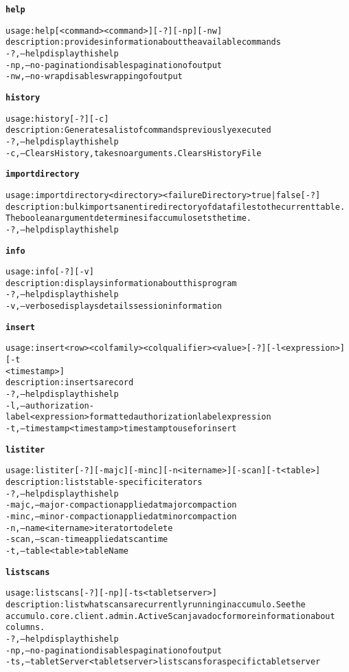 \begin{alltt}
\textbf{help}

    usage: help [ <command>{ <command>} ] [-?] [-np] [-nw]
    description: provides information about the available commands
      -?,--help  display this help
      -np,--no-pagination  disables pagination of output
      -nw,--no-wrap  disables wrapping of output

\textbf{history}

    usage: history [-?] [-c]
    description: Generates a list of commands previously executed
      -?,--help  display this help
      -c,--Clears History, takes no arguments.  Clears History File

\textbf{importdirectory}

    usage: importdirectory <directory> <failureDirectory> true|false [-?]
    description: bulk imports an entire directory of data files to the current table. 
              The boolean argument determines if accumulo sets the time.
      -?,--help  display this help

\textbf{info}

    usage: info [-?] [-v]
    description: displays information about this program
      -?,--help  display this help
      -v,--verbose  displays details session information

\textbf{insert}

    usage: insert <row> <colfamily> <colqualifier> <value> [-?] [-l <expression>] [-t
              <timestamp>]
    description: inserts a record
      -?,--help  display this help
      -l,--authorization-label <expression>  formatted authorization label expression
      -t,--timestamp <timestamp>  timestamp to use for insert

\textbf{listiter}

    usage: listiter [-?] [-majc] [-minc] [-n <itername>] [-scan] [-t <table>]
    description: lists table-specific iterators
      -?,--help  display this help
      -majc,--major-compaction  applied at major compaction
      -minc,--minor-compaction  applied at minor compaction
      -n,--name <itername>  iterator to delete
      -scan,--scan-time  applied at scan time
      -t,--table <table>  tableName

\textbf{listscans}

    usage: listscans [-?] [-np] [-ts <tablet server>]
    description: list what scans are currently running in accumulo. See the
              accumulo.core.client.admin.ActiveScan javadoc for more information about
              columns.
      -?,--help  display this help
      -np,--no-pagination  disables pagination of output
      -ts,--tabletServer <tablet server>  list scans for a specific tablet server


\end{alltt}
